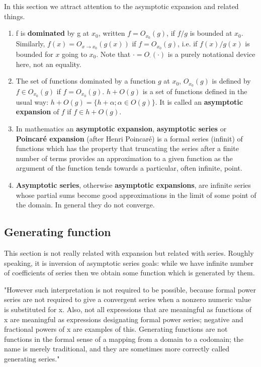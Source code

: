 \documentclass[a4paper]{article}
\begin{document}
   In this section we attract attention to the asymptotic expansion and related things.
   
        \begin{enumerate}
            \item f is \textbf{dominated} by g at $x_0$, written $f = O_{x_0}(g)$, if $f/g$ is bounded at $x_0$. Similarly, $f(x) = O_{x \rightarrow x_0}(g(x))$ if $f = O_{x_0}(g)$, i.e. if $f(x)/g(x)$ is bounded for $x$ going to $x_0$. Note that $\cdot = O_\cdot(\cdot)$ is a purely notational device here, not an equality.
            
            \item The set of functions dominated by a function $g$ at $x_0$, $O_{x_0}(g)$ is defined by $f \in O_{x_0}(g)$ if $f = O_{x_0}(g)$. $h + O(g)$ is a set of functions defined in the usual way: $h + O(g) = \{h+\alpha ; \alpha \in O(g)\}$. It is called an \textbf{asymptotic expansion} of $f$ if $f \in h + O(g)$.
            
            \item In mathematics an \textbf{asymptotic expansion}, \textbf{asymptotic series} or \textbf{Poincaré expansion} (after Henri Poincaré) is a
formal series (infinit) of functions which has the property that truncating the series after a finite number of terms provides an
approximation to a given function as the argument of the function tends towards a particular, often infinite, point.

            \item \textbf{Asymptotic series}, otherwise \textbf{asymptotic expansions}, are infinite series whose partial sums become good
approximations in the limit of some point of the domain. In general they do not converge.

        \end{enumerate}
        
        
    \subsection{Generating function}
    
    This section is not really related with expansion but related with series. Roughly speaking, it is inversion of asymptotic series goals: while we have infinite number of coefficients of series then we obtain some function which is generated by them.
    
    "However such interpretation is not required to be possible, because formal power series are not required to give a
convergent series when a nonzero numeric value is substituted for x. Also, not all expressions that are meaningful as
functions of x are meaningful as expressions designating formal power series; negative and fractional powers of x are
examples of this. 
Generating functions are not functions in the formal sense of a mapping from a domain to a codomain; the name is
merely traditional, and they are sometimes more correctly called generating series."
\end{document}
